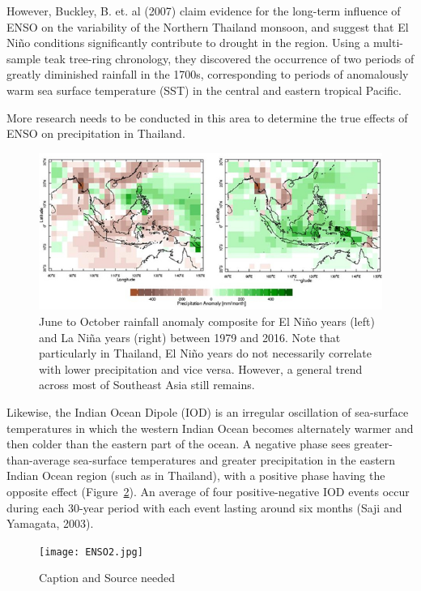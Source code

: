 However, Buckley, B. et. al (2007) claim evidence for the long-term influence of ENSO on the variability of the Northern Thailand monsoon, and suggest that El Niño conditions significantly contribute to drought in the region. Using a multi-sample teak tree-ring chronology, they discovered the occurrence of two periods of greatly diminished rainfall in the 1700s, corresponding to periods of anomalously warm sea surface temperature (SST) in the central and eastern tropical Pacific. 

More research needs to be conducted in this area to determine the true effects of ENSO on precipitation in Thailand.

\begin{figure}[h]
	\centering
		\includegraphics[width=1.00\textwidth]{graphics/Rainfall_Anomly_Thailand.jpg}
	\caption{June to October rainfall anomaly composite for El Niño years (left) and La Niña years (right) between 1979 and 2016. Note that particularly in Thailand, El Niño years do not necessarily correlate with lower precipitation and vice versa. However, a general trend across most of Southeast Asia still remains.}
	\label{fig:Rainfall_Anomly_Thailand}
\end{figure}

Likewise, the Indian Ocean Dipole (IOD) is an irregular oscillation of sea-surface temperatures in which the western Indian Ocean becomes alternately warmer and then colder than the eastern part of the ocean. A negative phase sees greater-than-average sea-surface temperatures and greater precipitation in the eastern Indian Ocean region (such as in Thailand), with a positive phase having the opposite effect (Figure~\ref{fig:ENSO2}). An average of four positive-negative IOD events occur during each 30-year period with each event lasting around six months (Saji and Yamagata, 2003).

\begin{figure}[h!]
	\centering
		\texttt{[image: ENSO2.jpg]}
	\caption{Caption and Source needed}
	\label{fig:ENSO2}
\end{figure}

